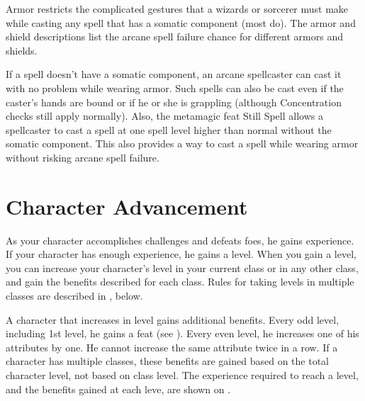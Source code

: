 Armor restricts the complicated gestures that a wizards or sorcerer must make while casting any spell that has a somatic component (most do). The armor and shield descriptions list the arcane spell failure chance for different armors and shields.

If a spell doesn't have a somatic component, an arcane spellcaster can cast it with no problem while wearing armor. Such spells can also be cast even if the caster's hands are bound or if he or she is grappling (although Concentration checks still apply normally). Also, the metamagic feat Still Spell allows a spellcaster to cast a spell at one spell level higher than normal without the somatic component. This also provides a way to cast a spell while wearing armor without risking arcane spell failure.

\section{Character Advancement}

As your character accomplishes challenges and defeats foes, he gains experience. If your character has enough experience, he gains a level. When you gain a level, you can increase your character's level in your current class or in any other class, and gain the benefits described for each class. Rules for taking levels in multiple classes are described in , below.

A character that increases in level gains additional benefits. Every odd level, including 1st level, he gains a feat (see ). Every even level, he increases one of his attributes by one. He cannot increase the same attribute twice in a row. If a character has multiple classes, these benefits are gained based on the total character level, not based on class level. The experience required to reach a level, and the benefits gained at each leve, are shown on .

